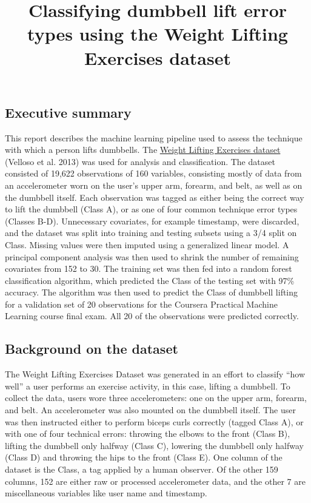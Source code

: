 \documentclass[]{article}
\title{Classifying dumbbell lift error types using the Weight Lifting Exercises
dataset}
\author{}
\date{\vspace{-2.5em}}
\begin{document}
\maketitle

\hypertarget{executive-summary}{%
\subsection{Executive summary}\label{executive-summary}}

This report describes the machine learning pipeline used to assess the
technique with which a person lifts dumbbells. The
\href{http://web.archive.org/web/20161224072740/http:/groupware.les.inf.puc-rio.br/har}{Weight
Lifting Exercises dataset} (Velloso et al. 2013) was used for analysis
and classification. The dataset consisted of 19,622 observations of 160
variables, consisting mostly of data from an accelerometer worn on the
user's upper arm, forearm, and belt, as well as on the dumbbell itself.
Each observation was tagged as either being the correct way to lift the
dumbbell (Class A), or as one of four common technique error types
(Classes B-D). Unnecessary covariates, for example timestamp, were
discarded, and the dataset was split into training and testing subsets
using a 3/4 split on Class. Missing values were then imputed using a
generalized linear model. A principal component analysis was then used
to shrink the number of remaining covariates from 152 to 30. The
training set was then fed into a random forest classification algorithm,
which predicted the Class of the testing set with 97\% accuracy. The
algorithm was then used to predict the Class of dumbbell lifting for a
validation set of 20 observations for the Coursera Practical Machine
Learning course final exam. All 20 of the observations were predicted
correctly.

\hypertarget{background-on-the-dataset}{%
\subsection{Background on the dataset}\label{background-on-the-dataset}}

The Weight Lifting Exercises Dataset was generated in an effort to
classify ``how well'' a user performs an exercise activity, in this
case, lifting a dumbbell. To collect the data, users wore three
accelerometers: one on the upper arm, forearm, and belt. An
accelerometer was also mounted on the dumbbell itself. The user was then
instructed either to perform biceps curls correctly (tagged Class A), or
with one of four technical errors: throwing the elbows to the front
(Class B), lifting the dumbbell only halfway (Class C), lowering the
dumbbell only halfway (Class D) and throwing the hips to the front
(Class E). One column of the dataset is the Class, a tag applied by a
human observer. Of the other 159 columns, 152 are either raw or
processed accelerometer data, and the other 7 are miscellaneous
variables like user name and timestamp.
\end{document}

